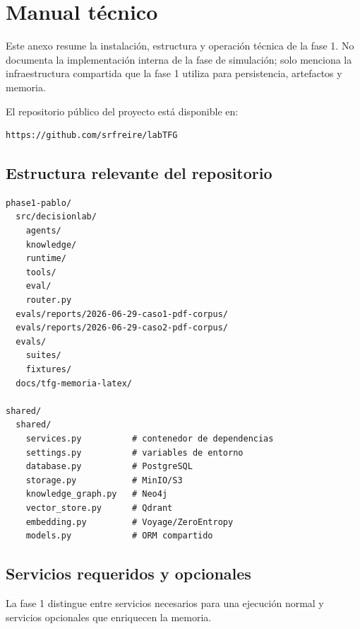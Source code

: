 \chapter{Manual técnico}
\label{ap:manual-tecnico}

Este anexo resume la instalación, estructura y operación técnica de la fase 1.
No documenta la implementación interna de la fase de simulación; solo menciona
la infraestructura compartida que la fase 1 utiliza para persistencia,
artefactos y memoria.

El repositorio público del proyecto está disponible en:

\begin{verbatim}
https://github.com/srfreire/labTFG
\end{verbatim}

\section{Estructura relevante del repositorio}

\begin{verbatim}
phase1-pablo/
  src/decisionlab/
    agents/
    knowledge/
    runtime/
    tools/
    eval/
    router.py
  evals/reports/2026-06-29-caso1-pdf-corpus/
  evals/reports/2026-06-29-caso2-pdf-corpus/
  evals/
    suites/
    fixtures/
  docs/tfg-memoria-latex/

shared/
  shared/
    services.py          # contenedor de dependencias
    settings.py          # variables de entorno
    database.py          # PostgreSQL
    storage.py           # MinIO/S3
    knowledge_graph.py   # Neo4j
    vector_store.py      # Qdrant
    embedding.py         # Voyage/ZeroEntropy
    models.py            # ORM compartido
\end{verbatim}

\section{Servicios requeridos y opcionales}

La fase 1 distingue entre servicios necesarios para una ejecución normal y
servicios opcionales que enriquecen la memoria.

